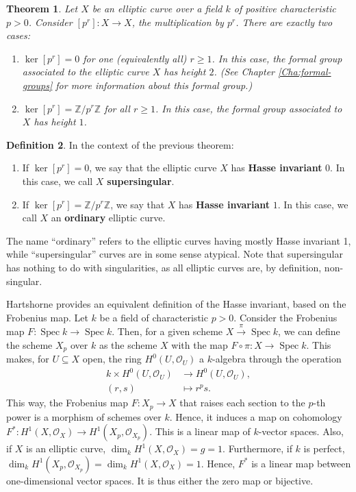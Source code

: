 \documentclass{report}
\DeclareMathOperator{\Spec}{Spec}
\newtheorem{theorem}{Theorem}[chapter]
\theoremstyle{definition}
\newtheorem{definition}[theorem]{Definition}
\begin{document}
\begin{theorem}
\label{the:supersingular}
Let $X$ be an elliptic curve over a field $k$ of positive characteristic $p>0$. Consider $[p^r]:X\rightarrow X$, the multiplication by $p^r$. There are exactly two cases:
\begin{enumerate}
\item $\ker[p^r]=0$ for one (equivalently all) $r\geq1$. In this case, the formal group associated to the elliptic curve $X$ has height $2$. (See Chapter \ref{Cha:formal-groups} for more information about this formal group.)

\item $\ker[p^r]=\mathbb{Z}/p^r\mathbb{Z}$ for all $r\geq1$. In this case, the formal group associated to $X$ has height $1$.
\end{enumerate}
\end{theorem}

\begin{definition}
In the context of the previous theorem:
\begin{enumerate}
\item If $\ker[p^r]=0$, we say that the elliptic curve $X$ has \textbf{Hasse invariant} $0$. In this case, we call $X$ \textbf{supersingular}.
\item If $\ker[p^r]=\mathbb{Z}/p^r\mathbb{Z}$, we say that $X$ has \textbf{Hasse invariant} $1$. In this case, we call $X$ an \textbf{ordinary} elliptic curve.
\end{enumerate}
\end{definition}

The name ``ordinary'' refers to the elliptic curves having mostly Hasse invariant 1, while ``supersingular'' curves are in some sense atypical. Note that supersingular has nothing to do with singularities, as all elliptic curves are, by definition, non-singular.

Hartshorne \cite[Section~IV.4]{hartshorne2013algebraic} provides an equivalent definition of the Hasse invariant, based on the Frobenius map. Let $k$ be a field of characteristic $p>0$. Consider the Frobenius map $F:\Spec k\rightarrow\Spec k$. Then, for a given scheme $X\xrightarrow{\pi}\Spec k$, we can define the scheme $X_p$ over $k$ as the scheme $X$ with the map $F\circ\pi:X\rightarrow\Spec k$. This makes, for $U\subseteq X$ open, the ring $H^0(U,\mathcal{O}_U)$ a $k$-algebra through the operation
\begin{align*}
k\times H^0(U,\mathcal{O}_U)&\longrightarrow H^0(U,\mathcal{O}_U),\\
(r,s)&\longmapsto r^ps.
\end{align*}
This way, the Frobenius map $F:X_p\rightarrow X$ that raises each section to the $p$-th power is a morphism of schemes over $k$. Hence, it induces a map on cohomology $F^*:H^1(X,\mathcal{O}_X)\rightarrow H^1(X_p,\mathcal{O}_{X_p})$. This is a linear map of $k$-vector spaces. Also, if $X$ is an elliptic curve, $\dim_kH^1(X,\mathcal{O}_X)=g=1$. Furthermore, if $k$ is perfect, $\dim_kH^1(X_p,\mathcal{O}_{X_p})=\dim_kH^1(X,\mathcal{O}_X)=1$. Hence, $F^*$ is a linear map between one-dimensional vector spaces. It is thus either the zero map or bijective.
\end{document}
